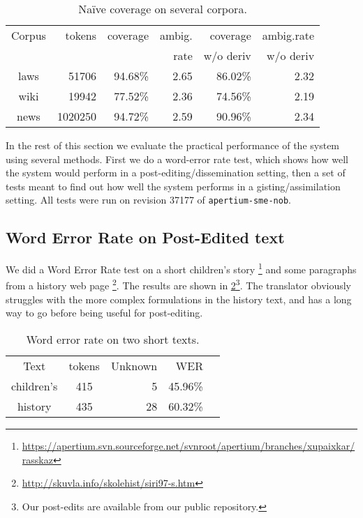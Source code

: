 \begin{table}
  \begin{center}
  \begin{tabular}{crrrrr}
   Corpus     & tokens   & coverage & ambig.      & coverage   & ambig.rate  \\
              &          &          & rate        & w/o deriv  & w/o deriv \\
   laws       &  51706   & 94.68\%  & 2.65        & 86.02\%    & 2.32 \\
   wiki       & 19942    & 77.52\%  & 2.36        & 74.56\%    & 2.19 \\
   news       & 1020250  & 94.72\%  & 2.59        & 90.96\%    & 2.34 \\
  \end{tabular}
    \caption{Na\"{i}ve coverage on several corpora.}
    \label{table:cov}
  \end{center}
\end{table}
In the rest of this section we evaluate the practical performance of
the system using several methods. First we do a word-error rate test,
which shows how well the system would perform in a
post-editing/dissemination setting, then a set of tests meant to find
out how well the system performs in a gisting/assimilation setting.
All tests were run on revision 37177 of \texttt{apertium-sme-nob}.



\subsection{Word Error Rate on Post-Edited text}
\label{sec:WER}
We did a Word Error Rate test on a short children's story
\footnote{\href{https://apertium.svn.sourceforge.net/svnroot/apertium/branches/xupaixkar/rasskaz}{https://apertium.svn.sourceforge.net/svnroot/apertium/branches/xupaixkar/rasskaz}}
and some paragraphs from a history web page
\footnote{\href{http://skuvla.info/skolehist/siri97-s.htm}{http://skuvla.info/skolehist/siri97-s.htm}}.
The results are shown in \ref{table:wer}\footnote{Our post-edits are
  available from our public repository.}. The translator obviously
struggles with the more complex formulations in the history text, and
has a long way to go before being useful for post-editing.


\begin{table}
  \begin{center}
  \begin{tabular}{ccrrr}
   Text       & tokens & Unknown & WER  \\
   children's & 415     & 5      & 45.96\% \\
   history    & 435     & 28     & 60.32\%  \\
  \end{tabular}
    \caption{Word error rate on two short texts.}
    \label{table:wer}
  \end{center}
\end{table}


